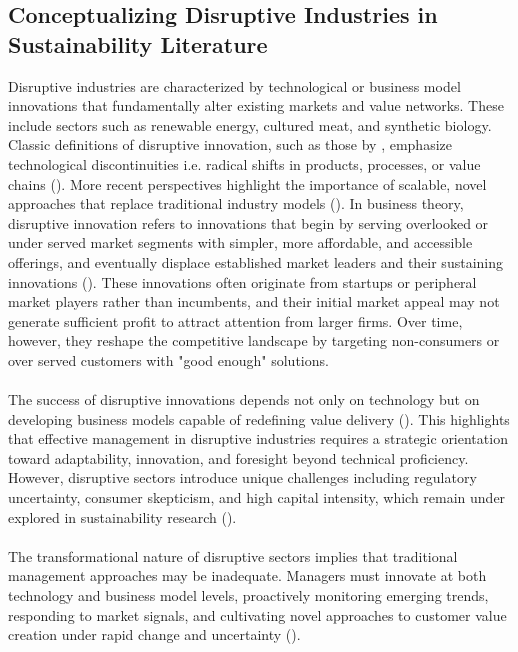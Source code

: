 	\subsection{Conceptualizing Disruptive Industries in Sustainability Literature}
	Disruptive industries are characterized by technological or business model innovations that fundamentally alter existing markets and value networks. These include sectors such as renewable energy, cultured meat, and synthetic biology. Classic definitions of disruptive innovation, such as those by \citeauthor{Tushman1986}, emphasize technological discontinuities i.e. radical shifts in products, processes, or value chains (\textcite{Tushman1986}). More recent perspectives highlight the importance of scalable, novel approaches that replace traditional industry models (\textcite{Yu2010}). In business theory, disruptive innovation refers to innovations that begin by serving overlooked or under served market segments with simpler, more affordable, and accessible offerings, and eventually displace established market leaders and their sustaining innovations (\textcite{Christensen1997}). These innovations often originate from startups or peripheral market players rather than incumbents, and their initial market appeal may not generate sufficient profit to attract attention from larger firms. Over time, however, they reshape the competitive landscape by targeting non-consumers or over served customers with "good enough" solutions.
	
	\paragraph*{} The success of disruptive innovations depends not only on technology but on developing business models capable of redefining value delivery (\textcite{Chesbrough2007}). This highlights that effective management in disruptive industries requires a strategic orientation toward adaptability, innovation, and foresight beyond technical proficiency. However, disruptive sectors introduce unique challenges including regulatory uncertainty, consumer skepticism, and high capital intensity, which remain under explored in sustainability research (\textcite{Wustenhagen2007}).
	
	\paragraph*{} The transformational nature of disruptive sectors implies that traditional management approaches may be inadequate. Managers must innovate at both technology and business model levels, proactively monitoring emerging trends, responding to market signals, and cultivating novel approaches to customer value creation under rapid change and uncertainty (\textcite{Teece2007}).
	
